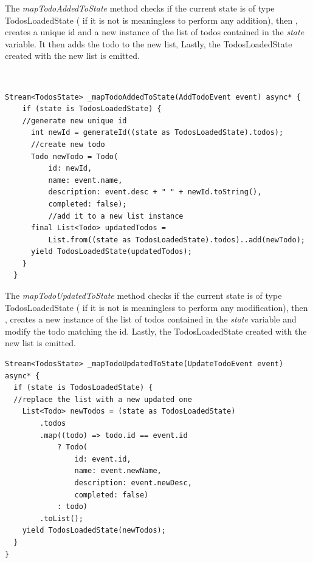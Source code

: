 The \textit{mapTodoAddedToState}  method checks if the current state is of type TodosLoadedState ( if it is not is meaningless to perform any addition), then , creates a unique id and a new instance of the list of todos contained in the \textit{state} variable. It  then adds the todo to the new list, Lastly, the TodosLoadedState  created with the new list is emitted. 
\begin{code}
\mbox{}\\
 \mbox{}
\label{code:2.14}
\begin{verbatim}
Stream<TodosState> _mapTodoAddedToState(AddTodoEvent event) async* {
    if (state is TodosLoadedState) {
    //generate new unique id
      int newId = generateId((state as TodosLoadedState).todos);
      //create new todo
      Todo newTodo = Todo(
          id: newId,
          name: event.name,
          description: event.desc + " " + newId.toString(),
          completed: false);
          //add it to a new list instance
      final List<Todo> updatedTodos =
          List.from((state as TodosLoadedState).todos)..add(newTodo);
      yield TodosLoadedState(updatedTodos);
    }
  }
\end{verbatim}
\mbox{}
\end{code}


The \textit{mapTodoUpdatedToState} method checks if the current state is of type TodosLoadedState ( if it is not is meaningless to perform any modification), then , creates a new instance of the list of todos contained in the \textit{state} variable and modify the todo matching the id. Lastly, the TodosLoadedState  created with the new list is emitted. 

\begin{code}
\mbox{}
 \mbox{}
\label{code:2.14}
\begin{verbatim}
Stream<TodosState> _mapTodoUpdatedToState(UpdateTodoEvent event) async* {
  if (state is TodosLoadedState) {
  //replace the list with a new updated one
    List<Todo> newTodos = (state as TodosLoadedState)
        .todos
        .map((todo) => todo.id == event.id
            ? Todo(
                id: event.id,
                name: event.newName,
                description: event.newDesc,
                completed: false)
            : todo)
        .toList();
    yield TodosLoadedState(newTodos);
  }
}
\end{verbatim}
\mbox{}
\end{code}
